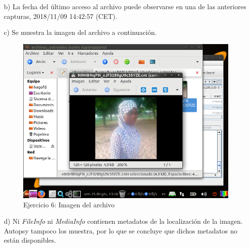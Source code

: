 \documentclass[11pt]{article}
\begin{document}
b) La fecha del último acceso al archivo puede observarse en una de las anteriores capturas, 2018/11/09 14:42:57 (CET).

c) Se muestra la imagen del archivo a continuación.

\begin{figure}[H]
    \caption{Ejercicio 6: Imagen del archivo}
    \centering
    \includegraphics[scale=0.7]{e6-3.png}
\end{figure}

d) Ni \textit{FileInfo} ni \textit{MediaInfo} contienen metadatos de la localización de la imagen. Autopsy tampoco los muestra, por lo que se concluye que dichos metadatos no están disponibles.



\begin{thebibliography}{8}
\end{thebibliography}
\end{document}
